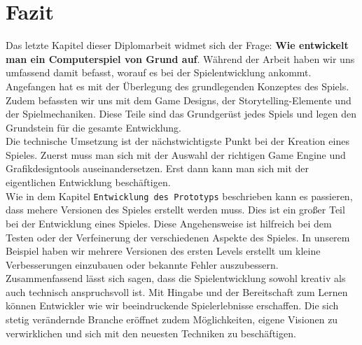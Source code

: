 \pagebreak
{}

\chapter{Fazit}
Das letzte Kapitel dieser Diplomarbeit widmet sich der Frage: \glqq \textbf{Wie entwickelt man ein Computerspiel von Grund auf}\grqq. Während der Arbeit haben wir uns umfassend damit befasst, worauf es bei der Spielentwicklung ankommt. \\

Angefangen hat es mit der Überlegung des grundlegenden Konzeptes des Spiels. Zudem befassten wir uns mit dem Game Designs, der Storytelling-Elemente und der Spielmechaniken. Diese Teile sind das Grundgerüst jedes Spiels und legen den Grundstein für die gesamte Entwicklung.\\

Die technische Umsetzung ist der nächstwichtigste Punkt bei der Kreation eines Spieles. Zuerst muss man sich mit der Auswahl der richtigen Game Engine und Grafikdesigntools auseinandersetzen. Erst dann kann man sich mit der eigentlichen Entwicklung beschäftigen.\\

Wie in dem Kapitel \verb+Entwicklung des Prototyps+ beschrieben kann es passieren, dass mehere Versionen des Spieles erstellt werden muss. Dies ist ein großer Teil bei der Entwicklung eines Spieles. Diese Angehensweise ist hilfreich bei dem Testen oder der Verfeinerung der verschiedenen Aspekte des Spieles. In unserem Beispiel haben wir mehrere Versionen des ersten Levels erstellt um kleine Verbesserungen einzubauen oder bekannte Fehler auszubessern.\\

Zusammenfassend lässt sich sagen, dass die Spielentwicklung sowohl kreativ als auch technisch anspruchsvoll ist. Mit Hingabe und der Bereitschaft zum Lernen können Entwickler wie wir beeindruckende Spielerlebnisse erschaffen. Die sich stetig verändernde Branche eröffnet zudem Möglichkeiten, eigene Visionen zu verwirklichen und sich mit den neuesten Techniken zu beschäftigen.